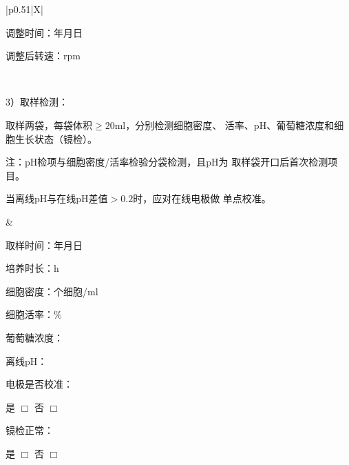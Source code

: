 \documentclass[UTF8,10pt,a4paper,fontset=fandol]{ctexart}
\begin{document}
\begin{tabularx}{\textwidth}{|p{0.51\textwidth}|X|}
\begin{minipage}[t]{\linewidth}
调整时间：\underline{\hspace{0.45cm}}年\underline{\hspace{0.45cm}}月\underline{\hspace{0.45cm}}日

调整后转速：\underline{\hspace{0.9cm}}rpm
\vspace{2pt}
\end{minipage}
\\
\hline
\begin{minipage}[t]{\linewidth}
\vspace{2pt}
3）取样检测：

取样两袋，每袋体积$\geq20$ml，分别检测细胞密度、
活率、pH、葡萄糖浓度和细胞生长状态（镜检）。

注：pH检项与细胞密度/活率检验分袋检测，且pH为
取样袋开口后首次检测项目。

当离线pH与在线pH差值$>0.2$时，应对在线电极做
单点校准。
\vspace{4pt}
\end{minipage}
&
\begin{minipage}[t]{\linewidth}
\vspace{2pt}
取样时间：\underline{\hspace{0.45cm}}年\underline{\hspace{0.45cm}}月\underline{\hspace{0.45cm}}日

培养时长：\underline{\hspace{0.8cm}}h

细胞密度：\underline{\hspace{1.0cm}}个细胞/ml

细胞活率：\underline{\hspace{1.0cm}}\%

葡萄糖浓度：\underline{\hspace{1.0cm}}

离线pH：\underline{\hspace{1.0cm}}

电极是否校准：

是 $\Box$ \quad 否 $\Box$

镜检正常：

是 $\Box$ \quad 否 $\Box$
\vspace{2pt}
\end{minipage}
\\
\hline
\end{tabularx}

\vspace{3pt}
\end{document}
